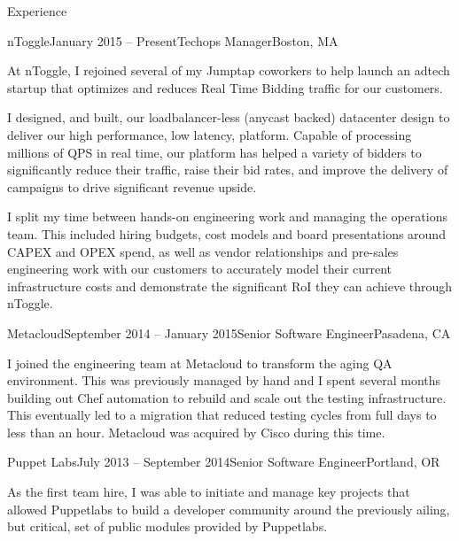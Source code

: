 \documentclass{resume} %
\begin{document}

\begin{rSection}{Experience}

\begin{rSubsection}{nToggle}{January 2015 -- Present}{Techops Manager}{Boston, MA}
\item[] At nToggle, I rejoined several of my Jumptap coworkers to help launch an adtech startup that optimizes and reduces Real Time Bidding traffic for our customers.

I designed, and built, our loadbalancer-less (anycast backed) datacenter design to deliver our high performance, low latency, platform.  Capable of processing millions of QPS in real time, our platform has helped a variety of bidders to significantly reduce their traffic, raise their bid rates, and improve the delivery of campaigns to drive significant revenue upside.  

I split my time between hands-on engineering work and managing the operations team.  This included hiring budgets, cost models and board presentations around CAPEX and OPEX spend, as well as vendor relationships and pre-sales engineering work with our customers to accurately model their current infrastructure costs and demonstrate the significant RoI they can achieve through nToggle.

\end{rSubsection}

\begin{rSubsection}{Metacloud}{September 2014 -- January 2015}{Senior Software Engineer}{Pasadena, CA}
\item[] I joined the engineering team at Metacloud to transform the aging QA environment.  This was previously managed by hand and I spent several months building out Chef automation to rebuild and scale out the testing infrastructure.  This eventually led to a migration that reduced testing cycles from full days to less than an hour.  Metacloud was acquired by Cisco during this time.
\end{rSubsection}

\begin{rSubsection}{Puppet Labs}{July 2013 -- September 2014}{Senior Software Engineer}{Portland, OR}
\item[] As the first team hire, I was able to initiate and manage key projects that allowed Puppetlabs to build a developer community around the previously ailing, but critical, set of public modules provided by Puppetlabs.


\end{rSubsection}
\end{rSection}
\end{document}
